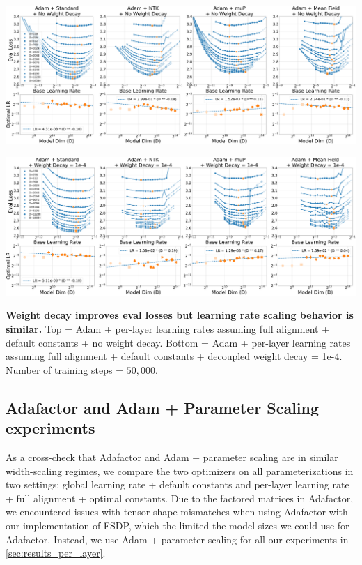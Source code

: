 \documentclass{article}
\theoremstyle{plain}
\theoremstyle{definition}
\theoremstyle{remark}
\begin{document}
\clearpage
\thispagestyle{plain}
\begin{SidewaysFigure}
        \includegraphics[width=\linewidth]{icml2024/figures/wd_appendix/adam+50k_steps_per_module_lr.pdf}
        
        \figvspace
        
        \includegraphics[width=\linewidth]{icml2024/figures/wd_appendix/adam+50k_steps_per_module_lr_wd.pdf}
        \caption{\textbf{Weight decay improves eval losses but learning rate scaling behavior is similar.} Top = Adam + per-layer learning rates assuming full alignment + default constants + no weight decay. Bottom = Adam + per-layer learning rates assuming full alignment + default constants + decoupled weight decay = 1e-4. Number of training steps = $50{,}000$.}
        \label{fig:appendix_adam_weight_decay}
\end{SidewaysFigure}
\clearpage

        
        

\subsection{Adafactor and Adam + Parameter Scaling experiments}
\label{app:adafactor_adam_ps}
As a cross-check that Adafactor and Adam + parameter scaling are in similar width-scaling regimes, we compare the two optimizers on all parameterizations in two settings: global learning rate + default constants and per-layer learning rate + full alignment + optimal constants. Due to the factored matrices in Adafactor, we encountered issues with tensor shape mismatches when using Adafactor with our implementation of FSDP, which the limited the model sizes we could use for Adafactor. Instead, we use Adam + parameter scaling for all our experiments in \cref{sec:results_per_layer}.
\end{document}
